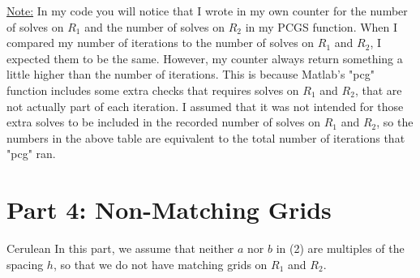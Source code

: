 \documentclass[12pt]{article}
\begin{document}
\noindent
\underline{Note:} In my code you will notice that I wrote in my own counter for the number of solves on $R_1$ and the number of solves on $R_2$ in my PCGS function.  When I compared my number of iterations to the number of solves on $R_1$ and $R_2$, I expected them to be the same.  However, my counter always return something a little higher than the number of iterations.  This is because Matlab's "pcg" function includes some extra checks that requires solves on $R_1$ and $R_2$, that are not actually part of each iteration.  I assumed that it was not intended for those extra solves to be included in the recorded number of solves on $R_1$ and $R_2$, so the numbers in the above table are equivalent to the total number of iterations that "pcg" ran.

\newpage
\section{Part 4: Non-Matching Grids} \begin{mybox}{Cerulean}{}
In this part, we assume that neither $a$ nor $b$ in (2) are multiples of the spacing $h$, so that we do not have matching grids on $R_1$ and $R_2$.\\
\end{mybox}\text{ }\\
\end{document}
